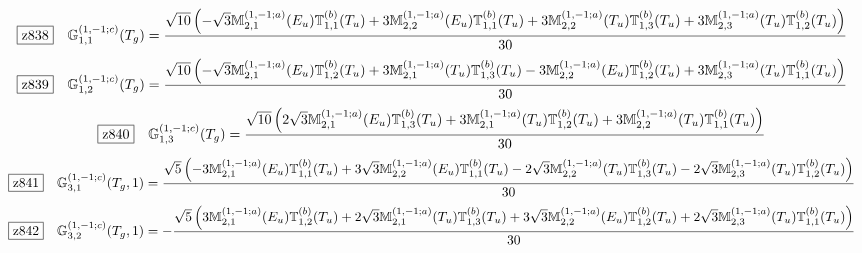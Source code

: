 \documentclass[fleqn,10pt,landscape]{jsarticle}
\begin{document}
\begin{dmath*}
\hspace*{3mm}\fbox{z838}\quad \mathbb{G}_{1,1}^{(1,-1;c)}(T_{g})=\frac{\sqrt{10} \left(- \sqrt{3} \mathbb{M}_{2,1}^{(1,-1;a)}(E_{u}) \mathbb{T}_{1,1}^{(b)}(T_{u}) + 3 \mathbb{M}_{2,2}^{(1,-1;a)}(E_{u}) \mathbb{T}_{1,1}^{(b)}(T_{u}) + 3 \mathbb{M}_{2,2}^{(1,-1;a)}(T_{u}) \mathbb{T}_{1,3}^{(b)}(T_{u}) + 3 \mathbb{M}_{2,3}^{(1,-1;a)}(T_{u}) \mathbb{T}_{1,2}^{(b)}(T_{u})\right)}{30}
\end{dmath*}
\begin{dmath*}
\hspace*{3mm}\fbox{z839}\quad \mathbb{G}_{1,2}^{(1,-1;c)}(T_{g})=\frac{\sqrt{10} \left(- \sqrt{3} \mathbb{M}_{2,1}^{(1,-1;a)}(E_{u}) \mathbb{T}_{1,2}^{(b)}(T_{u}) + 3 \mathbb{M}_{2,1}^{(1,-1;a)}(T_{u}) \mathbb{T}_{1,3}^{(b)}(T_{u}) - 3 \mathbb{M}_{2,2}^{(1,-1;a)}(E_{u}) \mathbb{T}_{1,2}^{(b)}(T_{u}) + 3 \mathbb{M}_{2,3}^{(1,-1;a)}(T_{u}) \mathbb{T}_{1,1}^{(b)}(T_{u})\right)}{30}
\end{dmath*}
\begin{dmath*}
\hspace*{3mm}\fbox{z840}\quad \mathbb{G}_{1,3}^{(1,-1;c)}(T_{g})=\frac{\sqrt{10} \left(2 \sqrt{3} \mathbb{M}_{2,1}^{(1,-1;a)}(E_{u}) \mathbb{T}_{1,3}^{(b)}(T_{u}) + 3 \mathbb{M}_{2,1}^{(1,-1;a)}(T_{u}) \mathbb{T}_{1,2}^{(b)}(T_{u}) + 3 \mathbb{M}_{2,2}^{(1,-1;a)}(T_{u}) \mathbb{T}_{1,1}^{(b)}(T_{u})\right)}{30}
\end{dmath*}
\begin{dmath*}
\hspace*{3mm}\fbox{z841}\quad \mathbb{G}_{3,1}^{(1,-1;c)}(T_{g},1)=\frac{\sqrt{5} \left(- 3 \mathbb{M}_{2,1}^{(1,-1;a)}(E_{u}) \mathbb{T}_{1,1}^{(b)}(T_{u}) + 3 \sqrt{3} \mathbb{M}_{2,2}^{(1,-1;a)}(E_{u}) \mathbb{T}_{1,1}^{(b)}(T_{u}) - 2 \sqrt{3} \mathbb{M}_{2,2}^{(1,-1;a)}(T_{u}) \mathbb{T}_{1,3}^{(b)}(T_{u}) - 2 \sqrt{3} \mathbb{M}_{2,3}^{(1,-1;a)}(T_{u}) \mathbb{T}_{1,2}^{(b)}(T_{u})\right)}{30}
\end{dmath*}
\begin{dmath*}
\hspace*{3mm}\fbox{z842}\quad \mathbb{G}_{3,2}^{(1,-1;c)}(T_{g},1)=- \frac{\sqrt{5} \left(3 \mathbb{M}_{2,1}^{(1,-1;a)}(E_{u}) \mathbb{T}_{1,2}^{(b)}(T_{u}) + 2 \sqrt{3} \mathbb{M}_{2,1}^{(1,-1;a)}(T_{u}) \mathbb{T}_{1,3}^{(b)}(T_{u}) + 3 \sqrt{3} \mathbb{M}_{2,2}^{(1,-1;a)}(E_{u}) \mathbb{T}_{1,2}^{(b)}(T_{u}) + 2 \sqrt{3} \mathbb{M}_{2,3}^{(1,-1;a)}(T_{u}) \mathbb{T}_{1,1}^{(b)}(T_{u})\right)}{30}
\end{dmath*}
\end{document}
